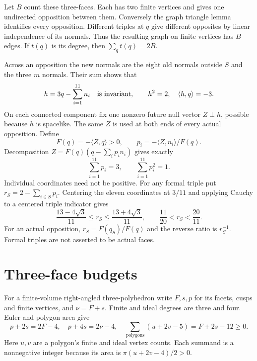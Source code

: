 \documentclass[11pt]{article}
\newcommand{\ip}[2]{\langle #1,#2\rangle}
\begin{document}
Let $B$ count these three-faces. Each has two finite vertices and
gives one undirected opposition between them. Conversely the graph
triangle lemma identifies every opposition. Different triples at $q$
give different opposites by linear independence of its normals.
Thus the resulting graph on finite vertices has $B$ edges.
If $t(q)$ is its degree, then $\sum_q t(q)=2B$.

Across an opposition the new normals are the eight old normals outside
$S$ and the three $m$ normals. Their sum shows that
\begin{equation}\label{eq:invariant}
 h=3q-\sum_{i=1}^{11}n_i
 \quad\hbox{is invariant},\qquad h^2=2,\quad\ip{h}{q}=-3.
\end{equation}
On each connected component fix one nonzero future null vector
$Z\perp h$, possible because $h$ is spacelike. The same $Z$ is
used at both ends of every actual opposition. Define
\begin{equation}\label{eq:frame}
 F(q)=-\ip{Z}{q}>0,\qquad p_i=-\ip{Z}{n_i}/F(q).
\end{equation}
Decomposition $Z=F(q)(q-\sum_i p_i n_i)$ gives exactly
\begin{equation}\label{eq:constraints}
 \sum_{i=1}^{11}p_i=3,\qquad \sum_{i=1}^{11}p_i^2=1.
\end{equation}
Individual coordinates need not be positive. For any formal triple put
$r_S=2-\sum_{i\in S}p_i$. Centering the eleven coordinates at $3/11$
and applying Cauchy to a centered triple indicator gives
\begin{equation}\label{eq:r-range}
 \frac{13-4\sqrt3}{11}\le r_S\le\frac{13+4\sqrt3}{11},
 \qquad \frac{11}{20}<r_S<\frac{20}{11}.
\end{equation}
For an actual opposition, $r_S=F(q_S)/F(q)$ and the reverse ratio
is $r_S^{-1}$. Formal triples are not asserted to be actual faces.

\section{Three-face budgets}
For a finite-volume right-angled three-polyhedron write $F,s,p$ for
its facets, cusps and finite vertices, and $\nu=F+s$.
Finite and ideal degrees are three and four. Euler and polygon area give
\begin{equation}\label{eq:3Euler}
 p+2s=2F-4,\quad p+4s=2\nu-4,\quad
 \sum_{\text{polygons}}(u+2v-5)=F+2s-12\ge0.
\end{equation}
Here $u,v$ are a polygon's finite and ideal vertex counts. Each
summand is a nonnegative integer because its area is
$\pi(u+2v-4)/2>0$.
\end{document}
